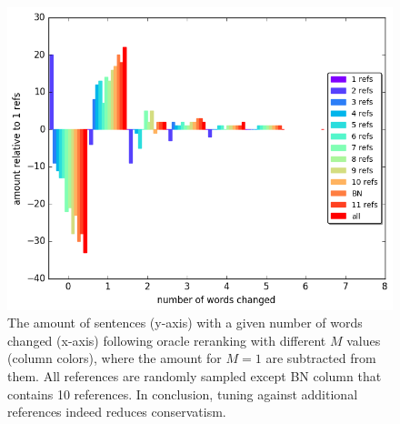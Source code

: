 \documentclass[a4paper, 11pt]{article}
\begin{document}
\begin{figure}
	\vspace{-1em}
	\includegraphics[width=0.9\columnwidth]{words_relative_differences_hist_reranking}
	\caption{The amount of sentences (y-axis) with a given number of words changed (x-axis) following oracle reranking with different $M$ values (column colors), where the amount for $M=1$ are subtracted from them.
		All references are randomly sampled except BN column that contains  10 references.
		In conclusion, tuning against additional references indeed reduces conservatism.
		\label{fig:reranking_word_change}
	}
	\vspace{-0.5cm}
\end{figure}
\end{document}
